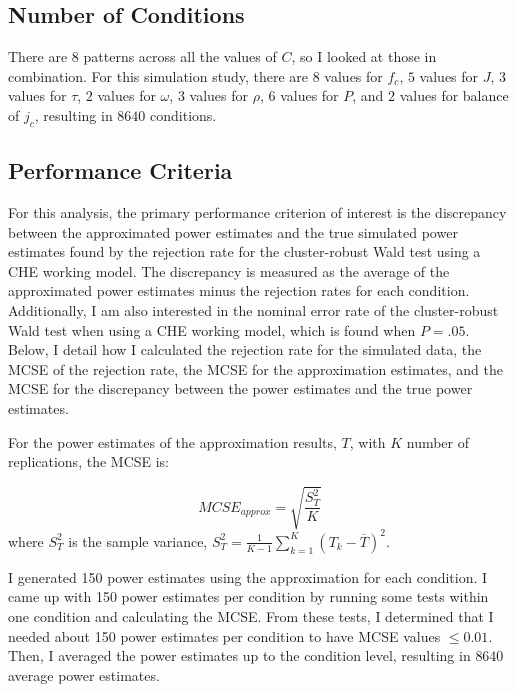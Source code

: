 \subsection{Number of Conditions}

There are $8$ patterns across all the values of $C$, so I looked at those in combination. For this simulation study, there are $8$ values for $f_c$, $5$ values for $J$, $3$ values for $\tau$, $2$ values for $\omega$, $3$ values for $\rho$, $6$ values for $P$, and $2$ values for balance of $j_c$, resulting in $8640$ conditions.  


\subsection{Performance Criteria}
For this analysis, the primary performance criterion of interest is the discrepancy between the approximated power estimates and the true simulated power estimates found by the rejection rate for the cluster-robust Wald test using a CHE working model. The discrepancy is measured as the average of the approximated power estimates minus the rejection rates for each condition. Additionally, I am also interested in the nominal error rate of the cluster-robust Wald test when using a CHE working model, which is found when $ P=.05$. Below, I detail how I calculated the rejection rate for the simulated data, the MCSE of the rejection rate, the MCSE for the approximation estimates, and the MCSE for the discrepancy between the power estimates and the true power estimates. 

For the power estimates of the approximation results, $T$, with $K$ number of replications, the MCSE is:

\begin{equation}
    MCSE_{approx} = \sqrt{\frac{S^2_T}{K}}
\end{equation}
where $S_T^2$ is the sample variance, $S_T^2 = \frac{1}{K-1}\sum_{k=1}^K(T_k - \overline{T})^2$. 

I generated 150 power estimates using the approximation for each condition. I came up with 150 power estimates per condition by running some tests within one condition and calculating the MCSE. From these tests, I determined that I needed about 150 power estimates per condition to have MCSE values $\leq 0.01$. Then, I averaged the power estimates up to the condition level, resulting in $8640$ average power estimates.

